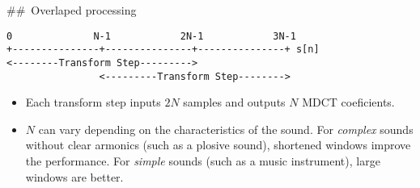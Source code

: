     \#\#~Overlaped processing

\begin{verbatim}
0              N-1            2N-1            3N-1
+---------------+---------------+---------------+ s[n]
<--------Transform Step--------->
                <---------Transform Step-------->
\end{verbatim}

\begin{itemize}
\item
  Each transform step inputs \(2N\) samples and outputs \(N\) MDCT
  coeficients.
\item
  \(N\) can vary depending on the characteristics of the sound. For
  \emph{complex} sounds without clear armonics (such as a plosive
  sound), shortened windows improve the performance. For \emph{simple}
  sounds (such as a music instrument), large windows are better.
\end{itemize}


